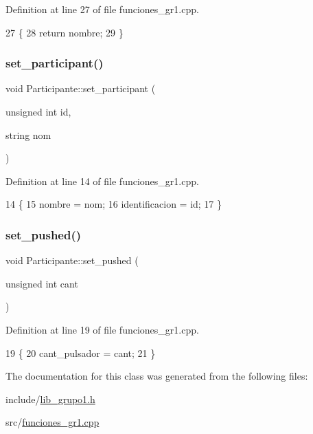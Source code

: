 Definition at line 27 of file funciones\+\_\+gr1.\+cpp.


\begin{DoxyCode}
27                                \{
28     \textcolor{keywordflow}{return} nombre;
29 \}
\end{DoxyCode}
\mbox{\label{classParticipante_a35e316f68e68fad881634be797a29000}} 
\subsubsection{\texorpdfstring{set\+\_\+participant()}{set\_participant()}}
{\footnotesize\ttfamily void Participante\+::set\+\_\+participant (\begin{DoxyParamCaption}\item[{unsigned int}]{id,  }\item[{string}]{nom }\end{DoxyParamCaption})}



Definition at line 14 of file funciones\+\_\+gr1.\+cpp.


\begin{DoxyCode}
14                                                              \{
15     nombre = nom;
16     identificacion = id;
17 \}
\end{DoxyCode}
\mbox{\label{classParticipante_a1a0ce183171c0b6b3ec8f0aab3ed9b75}} 
\subsubsection{\texorpdfstring{set\+\_\+pushed()}{set\_pushed()}}
{\footnotesize\ttfamily void Participante\+::set\+\_\+pushed (\begin{DoxyParamCaption}\item[{unsigned int}]{cant }\end{DoxyParamCaption})}



Definition at line 19 of file funciones\+\_\+gr1.\+cpp.


\begin{DoxyCode}
19                                               \{
20     cant\_pulsador = cant;
21 \}
\end{DoxyCode}


The documentation for this class was generated from the following files\+:\begin{DoxyCompactItemize}
\item 
include/\hyperlink{lib__grupo1_8h}{lib\+\_\+grupo1.\+h}\item 
src/\hyperlink{funciones__gr1_8cpp}{funciones\+\_\+gr1.\+cpp}\end{DoxyCompactItemize}
